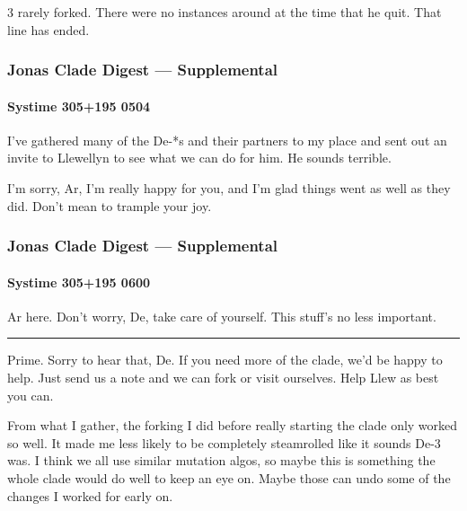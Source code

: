 3 rarely forked. There were no instances around at the time that he quit. That line has ended.

\hypertarget{jonas-clade-digest-supplemental-4}{%
\subsubsection{Jonas Clade Digest --- Supplemental}\label{jonas-clade-digest-supplemental-4}}

\hypertarget{systime-305195-0504}{%
\paragraph{Systime 305+195 0504}\label{systime-305195-0504}}

I've gathered many of the De-*s and their partners to my place and sent out an invite to Llewellyn to see what we can do for him. He sounds terrible.

I'm sorry, Ar, I'm really happy for you, and I'm glad things went as well as they did. Don't mean to trample your joy.

\hypertarget{jonas-clade-digest-supplemental-5}{%
\subsubsection{Jonas Clade Digest --- Supplemental}\label{jonas-clade-digest-supplemental-5}}

\hypertarget{systime-305195-0600}{%
\paragraph{Systime 305+195 0600}\label{systime-305195-0600}}

Ar here. Don't worry, De, take care of yourself. This stuff's no less important.

\begin{center}\rule{0.5\linewidth}{\linethickness}\end{center}

Prime. Sorry to hear that, De. If you need more of the clade, we'd be happy to help. Just send us a note and we can fork or visit ourselves. Help Llew as best you can.

From what I gather, the forking I did before really starting the clade only worked so well. It made me less likely to be completely steamrolled like it sounds De-3 was. I think we all use similar mutation algos, so maybe this is something the whole clade would do well to keep an eye on. Maybe those can undo some of the changes I worked for early on.


